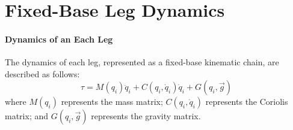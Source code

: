 \vspace{-10mm}
\chapter{Fixed-Base Leg Dynamics}
\label{appendix::b}
	\vspace{-5mm}


	\subsubsection{Dynamics of an Each \Ith Leg}

	The dynamics of each \Ith leg, represented as a fixed-base kinematic chain, are described as follows:	
	\begin{equation*}
		\tau = M(q_{i})\ddot{q}_{i} + C(q_{i},\dot{q}_{i})\dot{q}_{i} + G(q_{i},\vec{g})
	\end{equation*}
	where $M(q_{i})$ represents the mass matrix; $C(q_{i},\dot{q}_{i})$ represents the Coriolis matrix; and $G(q_{i},\vec{g})$ represents the gravity matrix. %

